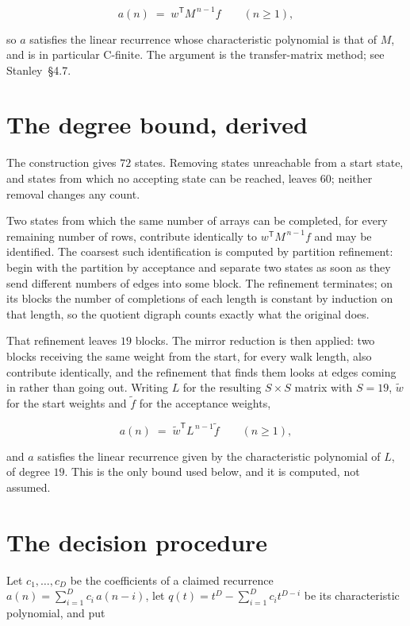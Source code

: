 \documentclass[11pt]{article}
\theoremstyle{definition}
\begin{document}
\[a(n) \;=\; w^{\mathsf T} M^{\,n-1} f \qquad (n \ge 1),\]

so $a$ satisfies the linear recurrence whose characteristic polynomial is that of $M$, and is in particular C-finite. The argument is the transfer-matrix method; see Stanley~\S4.7.

\section{The degree bound, derived}

The construction gives $72$ states. Removing states unreachable from a start state, and states from which no accepting state can be reached, leaves $60$; neither removal changes any count.

Two states from which the same number of arrays can be completed, for every remaining number of rows, contribute identically to $w^{\mathsf T}M^{\,n-1}f$ and may be identified. The coarsest such identification is computed by partition refinement: begin with the partition by acceptance and separate two states as soon as they send different numbers of edges into some block. The refinement terminates; on its blocks the number of completions of each length is constant by induction on that length, so the quotient digraph counts exactly what the original does.

That refinement leaves $19$ blocks. The mirror reduction is then applied: two blocks receiving the same weight from the start, for every walk length, also contribute identically, and the refinement that finds them looks at edges coming in rather than going out. Writing $L$ for the resulting $S \times S$ matrix with $S = 19$, $\tilde w$ for the start weights and $\tilde f$ for the acceptance weights,

\[a(n) \;=\; \tilde w^{\mathsf T} L^{\,n-1} \tilde f \qquad (n \ge 1),\]

and $a$ satisfies the linear recurrence given by the characteristic polynomial of $L$, of degree $19$. This is the only bound used below, and it is computed, not assumed.

\section{The decision procedure}

Let $c_1,\dots,c_D$ be the coefficients of a claimed recurrence $a(n) = \sum_{i=1}^{D} c_i\,a(n-i)$, let $q(t) = t^{D} - \sum_{i=1}^{D} c_i t^{D-i}$ be its characteristic polynomial, and put
\end{document}
